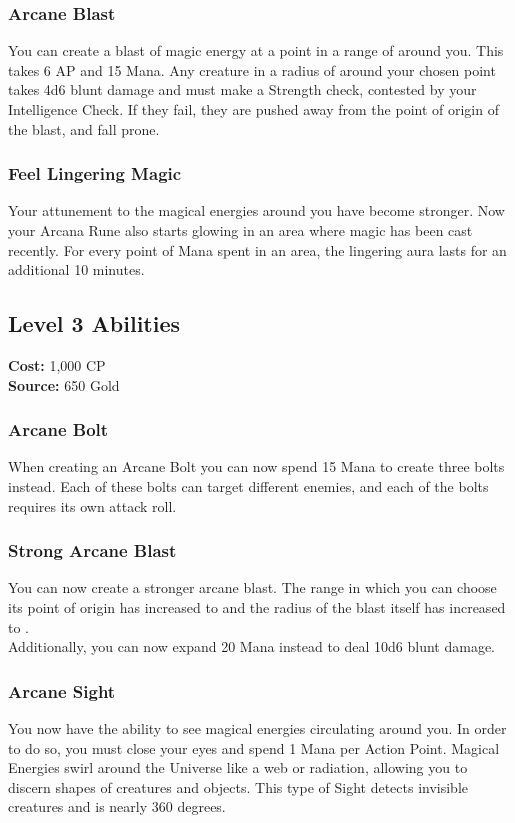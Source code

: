 \subsubsection{Arcane Blast}
You can create a blast of magic energy at a point in a range of  around you.
This takes 6 AP and 15 Mana.
Any creature in a radius of  around your chosen point takes 4d6 blunt damage and must make a Strength check, contested by your Intelligence Check.
If they fail, they are pushed  away from the point of origin of the blast, and fall prone.

\subsubsection{Feel Lingering Magic}
Your attunement to the magical energies around you have become stronger.
Now your Arcana Rune also starts glowing in an area where magic has been cast recently.
For every point of Mana spent in an area, the lingering aura lasts for an additional 10 minutes.

\subsection{Level 3 Abilities}
\textbf{Cost:} 1,000 CP\\
\textbf{Source:} 650 Gold
\subsubsection{Arcane Bolt}
When creating an Arcane Bolt you can now spend 15 Mana to create three bolts instead.
Each of these bolts can target different enemies, and each of the bolts requires its own attack roll.

\subsubsection{Strong Arcane Blast}
You can now create a stronger arcane blast.
The range in which you can choose its point of origin has increased to  and the radius of the blast itself has increased to .\\
Additionally, you can now expand 20 Mana instead to deal 10d6 blunt damage.

\subsubsection{Arcane Sight}
You now have the ability to see magical energies circulating around you.
In order to do so, you must close your eyes and spend 1 Mana per Action Point.
Magical Energies swirl around the Universe like a web or radiation, allowing you to discern shapes of creatures and objects.
This type of Sight detects invisible creatures and is nearly 360 degrees.
\onecolumn